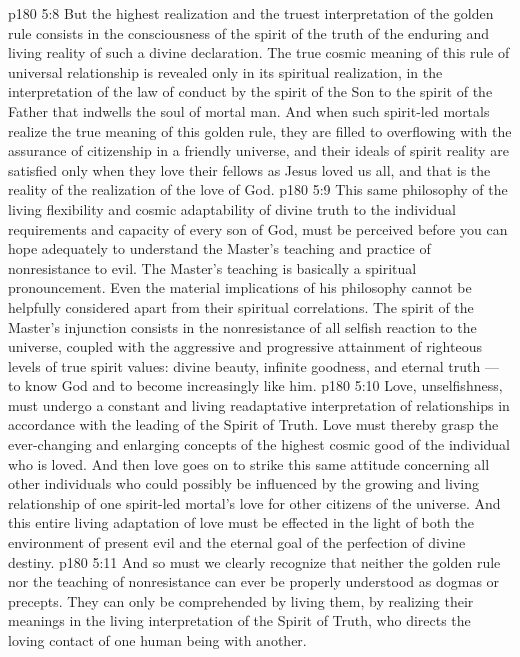 \vs p180 5:8 But the highest realization and the truest interpretation of the golden rule consists in the consciousness of the spirit of the truth of the enduring and living reality of such a divine declaration. The true cosmic meaning of this rule of universal relationship is revealed only in its spiritual realization, in the interpretation of the law of conduct by the spirit of the Son to the spirit of the Father that indwells the soul of mortal man. And when such spirit\hyp{}led mortals realize the true meaning of this golden rule, they are filled to overflowing with the assurance of citizenship in a friendly universe, and their ideals of spirit reality are satisfied only when they love their fellows as Jesus loved us all, and that is the reality of the realization of the love of God.
\vs p180 5:9 This same philosophy of the living flexibility and cosmic adaptability of divine truth to the individual requirements and capacity of every son of God, must be perceived before you can hope adequately to understand the Master’s teaching and practice of nonresistance to evil. The Master’s teaching is basically a spiritual pronouncement. Even the material implications of his philosophy cannot be helpfully considered apart from their spiritual correlations. The spirit of the Master’s injunction consists in the nonresistance of all selfish reaction to the universe, coupled with the aggressive and progressive attainment of righteous levels of true spirit values: divine beauty, infinite goodness, and eternal truth --- to know God and to become increasingly like him.
\vs p180 5:10 Love, unselfishness, must undergo a constant and living readaptative interpretation of relationships in accordance with the leading of the Spirit of Truth. Love must thereby grasp the ever\hyp{}changing and enlarging concepts of the highest cosmic good of the individual who is loved. And then love goes on to strike this same attitude concerning all other individuals who could possibly be influenced by the growing and living relationship of one spirit\hyp{}led mortal’s love for other citizens of the universe. And this entire living adaptation of love must be effected in the light of both the environment of present evil and the eternal goal of the perfection of divine destiny.
\vs p180 5:11 And so must we clearly recognize that neither the golden rule nor the teaching of nonresistance can ever be properly understood as dogmas or precepts. They can only be comprehended by living them, by realizing their meanings in the living interpretation of the Spirit of Truth, who directs the loving contact of one human being with another.

